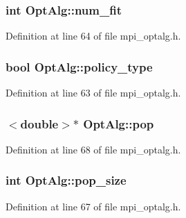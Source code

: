 \subsubsection[{num\+\_\+fit}]{\setlength{\rightskip}{0pt plus 5cm}int Opt\+Alg\+::num\+\_\+fit}\label{class_opt_alg_aad208e0441922169d0333c2277f1b7aa}


Definition at line 64 of file mpi\+\_\+optalg.\+h.

\hypertarget{class_opt_alg_ad269f7018945be9bdd6fb0237fb73c74}{}
\subsubsection[{policy\+\_\+type}]{\setlength{\rightskip}{0pt plus 5cm}bool Opt\+Alg\+::policy\+\_\+type}\label{class_opt_alg_ad269f7018945be9bdd6fb0237fb73c74}


Definition at line 63 of file mpi\+\_\+optalg.\+h.

\hypertarget{class_opt_alg_ae3e61ddad0b8f9a7170167852828c292}{}
\subsubsection[{pop}]{$<$double$>$$\ast$ Opt\+Alg\+::pop\hspace{0.3cm}{\ttfamily [protected]}}\label{class_opt_alg_ae3e61ddad0b8f9a7170167852828c292}


Definition at line 68 of file mpi\+\_\+optalg.\+h.

\hypertarget{class_opt_alg_a3e8052f94b8cbecfe087377cc5c9a530}{}
\subsubsection[{pop\+\_\+size}]{\setlength{\rightskip}{0pt plus 5cm}int Opt\+Alg\+::pop\+\_\+size\hspace{0.3cm}{\ttfamily [protected]}}\label{class_opt_alg_a3e8052f94b8cbecfe087377cc5c9a530}


Definition at line 67 of file mpi\+\_\+optalg.\+h.

\hypertarget{class_opt_alg_ad83a3cc560bd483e499f26f629817f21}{}
